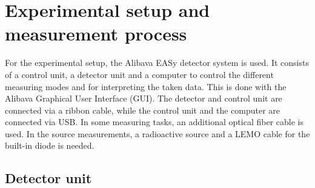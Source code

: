 \section{Experimental setup and measurement process}
\label{sec:Setup}
For the experimental setup, the Alibava EASy detector system is used. It consists of a control unit, a detector unit
and a computer to control the different measuring modes and for interpreting the taken data. This is done with the
Alibava Graphical User Interface (GUI). The detector and control unit are connected via a ribbon cable, while the 
control unit and the computer are connected via USB. In some measuring tasks, an additional optical fiber cable is
used. In the source measurements, a radioactive source and a LEMO cable for the built-in diode is needed.

\subsection{Detector unit}

